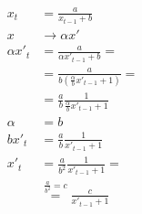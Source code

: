 \documentclass{article}
\begin{document}
	\begin{equation}
	\begin{aligned}
		x_t &= \frac{a}{x_{t-1}+b} \\
		x &\rightarrow \alpha x' \\
		\alpha x'_t &= \frac{a}{\alpha x'_{t-1} + b} = \\
		&= \frac{a}{b (\frac{\alpha}{b}x'_{t-1} + 1)} = \\
		&= \frac{a}{b} \frac{1}{\frac{\alpha}{b}x'_{t-1} + 1} \\
		\alpha &= b \\
		bx'_t &= \frac{a}{b} \frac{1}{x'_{t-1} + 1} \\
		x'_t &= \frac{a}{b^2} \frac{1}{x'_{t-1} + 1} = \\
		&\overset{\frac{a}{b^2}=c}{=} \frac{c}{x'_{t-1}+1}
	\end{aligned}
	\end{equation}
\end{document}

